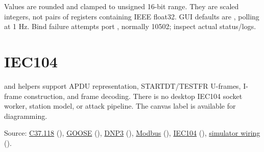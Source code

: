 Values are rounded and clamped to unsigned 16-bit range. They are scaled integers, not pairs of registers containing IEEE float32. GUI defaults are , polling at 1 Hz. Bind failure attempts port , normally 10502; inspect actual status/logs.

\section*{IEC104}
\par\noindent\begin{minipage}{\linewidth}\setlength{\parskip}{5pt}
 and helpers support APDU representation, STARTDT/TESTFR U-frames, I-frame construction, and frame decoding. There is no desktop IEC104 socket worker, station model, or attack pipeline. The canvas label is available for diagramming.
{\footnotesize\color{muted}\raggedright Source: \href{https://github.com/neerajjayesh/GridSec-project/blob/main/protocols/c37118.py}{C37.118} (), \href{https://github.com/neerajjayesh/GridSec-project/blob/main/protocols/goose.py}{GOOSE} (), \href{https://github.com/neerajjayesh/GridSec-project/blob/main/protocols/dnp3.py}{DNP3} (), \href{https://github.com/neerajjayesh/GridSec-project/blob/main/protocols/modbus.py}{Modbus} (), \href{https://github.com/neerajjayesh/GridSec-project/blob/main/protocols/iec104.py}{IEC104} (), \href{https://github.com/neerajjayesh/GridSec-project/blob/main/gui/main_window.py}{simulator wiring} ().\par}
\end{minipage}\par

